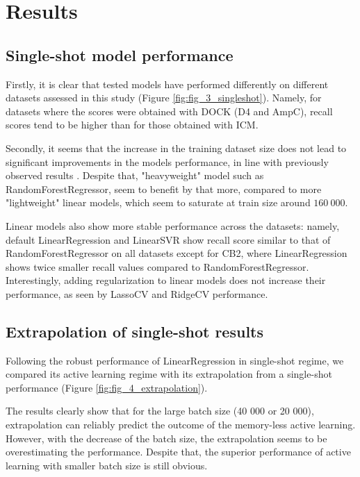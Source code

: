 \section{Results}

\subsection{Single-shot model performance}
\label{subsection:single-shot}

Firstly, it is clear that tested models have performed differently on different datasets assessed in this study (Figure \ref{fig:fig_3_singleshot}). Namely, for datasets where the scores were obtained with DOCK (D4 and AmpC), recall scores tend to be higher than for those obtained with ICM.

Secondly, it seems that the increase in the training dataset size does not lead to significant improvements in the models performance, in line with previously observed results \cite{Yang2021_shoichet_active_learning}. Despite that, "heavyweight" model such as RandomForestRegressor, seem to benefit by that more, compared to more "lightweight" linear models, which seem to saturate at train size around $160\ 000$.

Linear models also show more stable performance across the datasets: namely, default LinearRegression and LinearSVR show recall score similar to that of RandomForestRegressor on all datasets except for CB2, where LinearRegression shows twice smaller recall values compared to RandomForestRegressor. Interestingly, adding regularization to linear models does not increase their performance, as seen by LassoCV and RidgeCV performance.

\subsection{Extrapolation of single-shot results}
Following the robust performance of LinearRegression in single-shot regime, we compared its active learning regime with its extrapolation from a single-shot performance (Figure \ref{fig:fig_4_extrapolation}). 

The results clearly show that for the large batch size (40 000 or 20 000), extrapolation can reliably predict the outcome of the memory-less active learning. However, with the decrease of the batch size, the extrapolation seems to be overestimating the performance. Despite that, the superior performance of active learning with smaller batch size is still obvious.

